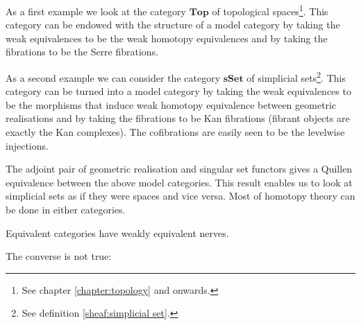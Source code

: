    \begin{example}
        As a first example we look at the category $\mathbf{Top}$ of topological spaces\footnote{See chapter \ref{chapter:topology} and onwards.}. This category can be endowed with the structure of a model category by taking the weak equivalences to be the weak homotopy equivalences and by taking the fibrations to be the Serre fibrations.
    \end{example}
    \begin{example}
        As a second example we can consider the category $\mathbf{sSet}$ of simplicial sets\footnote{See definition \ref{sheaf:simplicial set}.}. This category can be turned into a model category by taking the weak equivalences to be the morphisms that induce weak homotopy equivalence between geometric realisations and by taking the fibrations to be Kan fibrations (fibrant objects are exactly the Kan complexes). The cofibrations are easily seen to be the levelwise injections.
    \end{example}
    \begin{property}\label{cat:quillen_sset_top}
        The adjoint pair of geometric realisation and singular set functors gives a Quillen equivalence between the above model categories. This result enables us to look at simplicial sets as if they were spaces and vice versa. Most of homotopy theory can be done in either categories.
    \end{property}
    \begin{property}
        Equivalent categories have weakly equivalent nerves.
    \end{property}
    The converse is not true:

